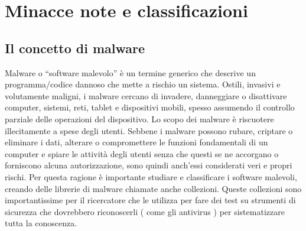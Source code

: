 \chapter{Minacce note e classificazioni}
\section{Il concetto di malware}
Malware o “software malevolo” è un termine generico che descrive un programma/codice dannoso che mette a rischio un sistema. Ostili, invasivi e volutamente maligni, i malware cercano di invadere, danneggiare o disattivare computer, sistemi, reti, tablet e dispositivi mobili, spesso assumendo il controllo parziale delle operazioni del dispositivo. Lo scopo dei malware è riscuotere illecitamente a spese degli utenti. Sebbene i malware possono rubare, criptare o eliminare i dati, alterare o compromettere le funzioni fondamentali di un computer e spiare le attività degli utenti senza che questi se ne accorgano o forniscono alcuna autorizzazione, sono quindi anch’essi considerati veri e propri rischi. Per questa ragione è importante studiare e classificare i software malevoli, creando delle librerie di malware chiamate anche collezioni. Queste collezioni sono importantissime per il ricercatore che le utilizza per fare dei test su strumenti di sicurezza che dovrebbero riconoscerli ( come gli antivirus ) per sistematizzare tutta la conoscenza.

